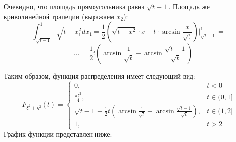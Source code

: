 \begin{exmp}
\begin{enumerate}
\begin{enumerate}
			Очевидно, что площадь прямоугольника равна $\sqrt{t-1}$. Площадь же криволинейной трапеции (выражаем $x_2$):
			\[ \int_{\sqrt{t-1}}^{1} \sqrt{t-x_1^2} dx_1 = \frac{1}{2} \left( \sqrt{t-x^2} \cdot x + t \cdot \arcsin \frac{x}{\sqrt{t}} \right) \bigg|_{\sqrt{t-1}}^{1} = \]
			\[ = \dots = \frac{1}{2} t \left( \arcsin \frac{1}{\sqrt{t}} - \arcsin \frac{\sqrt{t-1}}{\sqrt{t}} \right) \]
		\end{enumerate}
		\begin{figure}[H]
		\end{figure}
		Таким образом, функция распределения имеет следующий вид:
		\[
		F_{\xi^2 + \eta^2} (t) =
		\begin{cases}
			0, &t < 0 \\
			\frac{\pi t^2}{4}, &t \in (0, 1] \\
			\sqrt{t-1} + \frac{1}{2} t \left( \arcsin \frac{1}{\sqrt{t}} - \arcsin \frac{\sqrt{t-1}}{\sqrt{t}} \right), &t \in (1, 2] \\
			1, &t > 2
		\end{cases}
		\]
		График функции представлен ниже:
		\begin{figure}[H]
		\end{figure}
		

\end{enumerate}
\end{exmp}
